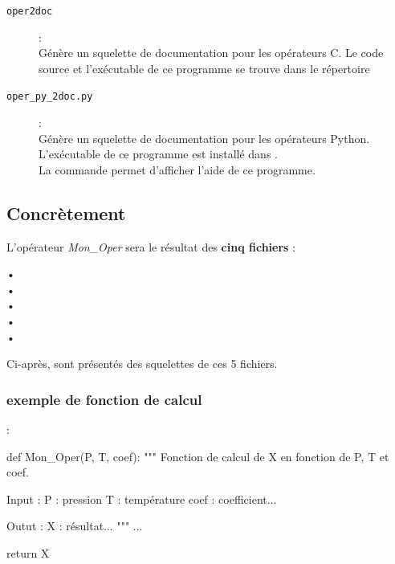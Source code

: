 \begin{description}
  \item[\texttt{oper2doc}] : \\
     Génère un squelette de documentation pour les opérateurs C.
     Le code source et l'exécutable de ce programme se trouve dans le
     répertoire 

  \item[\texttt{oper\_py\_2doc.py}]:  \\
     Génère un squelette de documentation pour les opérateurs Python.
     L'exécutable de ce programme est installé dans . \\
     La commande  permet d'afficher l'aide
     de ce programme.
\end{description}

\newpage
\subsection{Concrètement}
  L'opérateur \textit{Mon\_Oper} sera le résultat des
  \textbf{cinq fichiers} : \\

  \begin{description}
    \item[•] 
    \item[•] 
    \item[•] 
    \item[•] 
    \item[•] 
  \end{description}

  Ci-après, sont présentés des squelettes de ces 5 fichiers.

\subsubsection{exemple de fonction de calcul}
\label{sec:ex_fct_calcul}
 :

  \begin{boxedverbatim}
  def Mon_Oper(P, T, coef):
      """
      Fonction de calcul de X en fonction de P, T et coef.

      Input :
        P    : pression
        T    : température
        coef : coefficient...

      Outut :
        X    : résultat...
      """
      ...

      return X
  \end{boxedverbatim}


